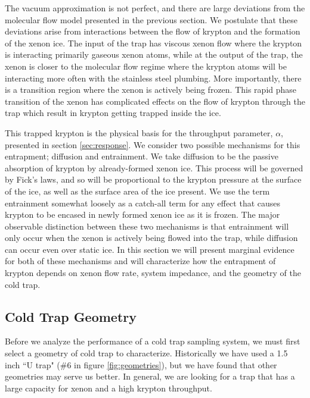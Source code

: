 The vacuum approximation is not perfect, and there are large deviations from the molecular flow model presented in the previous section. We postulate that these deviations arise from interactions between the flow of krypton and the formation of the xenon ice. The input of the trap has viscous xenon flow where the krypton is interacting primarily gaseous xenon atoms, while at the output of the trap, the xenon is closer to the molecular flow regime where the krypton atoms will be interacting more often with the stainless steel plumbing. More importantly, there is a transition region where the xenon is actively being frozen. This rapid phase transition of the xenon has complicated effects on the flow of krypton through the trap which result in krypton getting trapped inside the ice. 

This trapped krypton is the physical basis for the throughput parameter, $\alpha$, presented in section \ref{sec:response}. We consider two possible mechanisms for this entrapment; diffusion and entrainment. We take diffusion to be the passive absorption of krypton by already-formed xenon ice. This process will be governed by Fick's laws, and so will be proportional to the krypton pressure at the surface of the ice, as well as the surface area of the ice present. We use the term entrainment somewhat loosely as a catch-all term for any effect that causes krypton to be encased in newly formed xenon ice as it is frozen. The major observable distinction between these two mechanisms is that entrainment will only occur when the xenon is actively being flowed into the trap, while diffusion can occur even over static ice. In this section we will present marginal evidence for both of these mechanisms and will characterize how the entrapment of krypton depends on xenon flow rate, system impedance, and the geometry of the cold trap.


\subsection{Cold Trap Geometry}
\label{sec:geometry}
Before we analyze the performance of a cold trap sampling system, we must first select a geometry of cold trap to characterize. Historically we have used a 1.5 inch ``U trap" (\#6 in figure \ref{fig:geometries}), but we have found that other geometries may serve us better. In general, we are looking for a trap that has a large capacity for xenon and a high krypton throughput.

